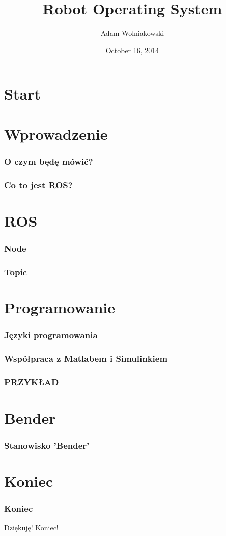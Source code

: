 \documentclass[12pt,a4paper,portrait]{beamer}
\author[AW]{Adam Wolniakowski}
\institute[WM PB]{Politechnika Białostocka}
\title[ROS]{Robot Operating System}
\date{October 16, 2014}
\begin{document}
\section{Start}
\begin{frame}
\titlepage
\end{frame}



\section{Wprowadzenie}
\begin{frame}
\frametitle{O czym będę mówić?}
\end{frame}

\begin{frame}
\frametitle{Co to jest ROS?}
\end{frame}



\section{ROS}
\begin{frame}
\frametitle{Node}
\end{frame}

\begin{frame}
\frametitle{Topic}
\end{frame}



\section{Programowanie}
\begin{frame}
\frametitle{Języki programowania}
\end{frame}

\begin{frame}
\frametitle{Współpraca z Matlabem i Simulinkiem}
\end{frame}

\begin{frame}
\frametitle{PRZYKŁAD}
\end{frame}





\section{Bender}
\begin{frame}
\frametitle{Stanowisko 'Bender'}
\end{frame}



\section{Koniec}
\begin{frame}
\frametitle{Koniec}
Dziękuję! Koniec!
\end{frame}
\end{document}
